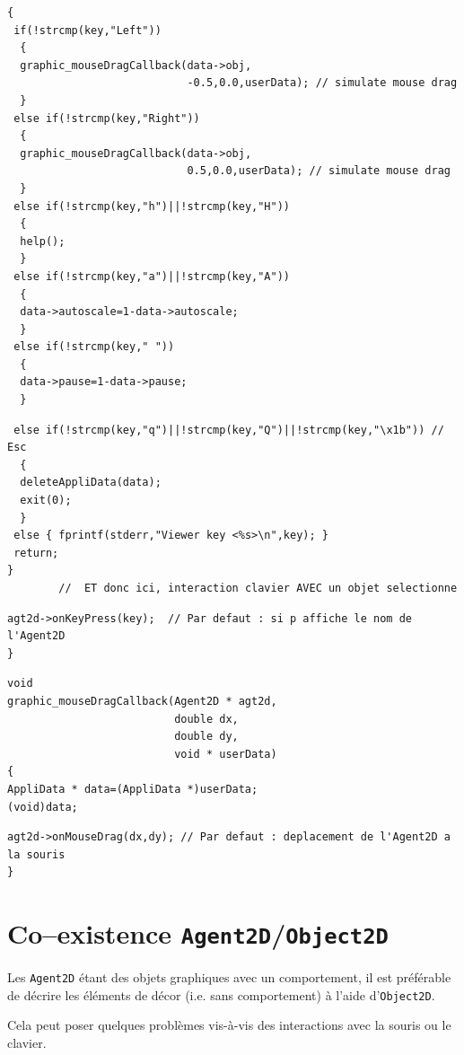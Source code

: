 \documentclass[12pt]{article}
\begin{document}
\begin{small}
\begin{verbatim}
{
 if(!strcmp(key,"Left"))
  {
  graphic_mouseDragCallback(data->obj,
                            -0.5,0.0,userData); // simulate mouse drag
  }
 else if(!strcmp(key,"Right"))
  {
  graphic_mouseDragCallback(data->obj,
                            0.5,0.0,userData); // simulate mouse drag
  }
 else if(!strcmp(key,"h")||!strcmp(key,"H"))
  {
  help();
  }
 else if(!strcmp(key,"a")||!strcmp(key,"A"))
  {
  data->autoscale=1-data->autoscale;
  }
 else if(!strcmp(key," "))
  {
  data->pause=1-data->pause;
  }
\end{verbatim}
\newpage
\begin{verbatim}
 else if(!strcmp(key,"q")||!strcmp(key,"Q")||!strcmp(key,"\x1b")) // Esc
  {
  deleteAppliData(data);
  exit(0);
  }
 else { fprintf(stderr,"Viewer key <%s>\n",key); }
 return;
}
        //  ET donc ici, interaction clavier AVEC un objet selectionne
\end{verbatim}
\vspace{-0.6cm}
\begin{verbatim}
agt2d->onKeyPress(key);  // Par defaut : si p affiche le nom de l'Agent2D
}
\end{verbatim}
\vspace{-0.6cm}
\begin{verbatim}
void
graphic_mouseDragCallback(Agent2D * agt2d,
                          double dx,
                          double dy,
                          void * userData)
{
AppliData * data=(AppliData *)userData;
(void)data;
\end{verbatim}
\vspace{-0.6cm}
\begin{verbatim}
agt2d->onMouseDrag(dx,dy); // Par defaut : deplacement de l'Agent2D a la souris
}
\end{verbatim}
\end{small}

\vspace{-0.4cm}
\section{Co--existence {\tt Agent2D}/{\tt Object2D}}

\vspace{-0.1cm}
Les {\tt Agent2D} \'etant des objets graphiques avec un comportement,
il est pr\'ef\'erable de d\'ecrire les \'el\'ements de d\'ecor
(i.e. sans comportement) \`a l'aide d'{\tt Object2D}.

\vspace{0.2cm}
Cela peut poser quelques probl\`emes vis-\`a-vis des interactions
avec la souris ou le clavier.
\end{document}
